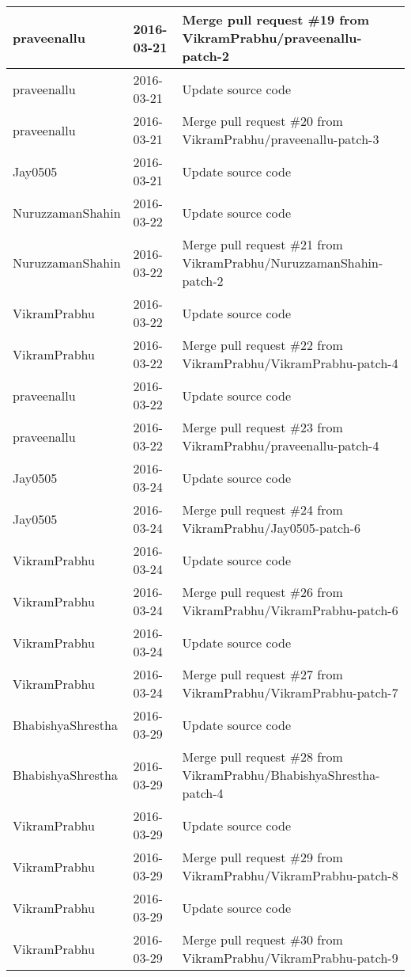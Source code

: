 \documentclass[a4paper]{article}
\begin{document}
\begin{center}
\begin{longtable}{|l|l|l|}
praveenallu & 2016-03-21 & Merge pull request \#19 from VikramPrabhu/praveenallu-patch-2 \\ \hline
praveenallu & 2016-03-21 & Update source code \\ \hline
praveenallu & 2016-03-21 & Merge pull request \#20 from VikramPrabhu/praveenallu-patch-3 \\ \hline
Jay0505 & 2016-03-21 & Update source code \\ \hline
NuruzzamanShahin & 2016-03-22 & Update source code \\ \hline
NuruzzamanShahin & 2016-03-22 & Merge pull request \#21 from VikramPrabhu/NuruzzamanShahin-patch-2 \\ \hline
VikramPrabhu & 2016-03-22 & Update source code \\ \hline
VikramPrabhu & 2016-03-22 & Merge pull request \#22 from VikramPrabhu/VikramPrabhu-patch-4 \\ \hline
praveenallu & 2016-03-22 & Update source code \\ \hline
praveenallu & 2016-03-22 & Merge pull request \#23 from VikramPrabhu/praveenallu-patch-4 \\ \hline
Jay0505 & 2016-03-24 & Update source code \\ \hline
Jay0505 & 2016-03-24 & Merge pull request \#24 from VikramPrabhu/Jay0505-patch-6 \\ \hline
VikramPrabhu & 2016-03-24 & Update source code \\ \hline
VikramPrabhu & 2016-03-24 & Merge pull request \#26 from VikramPrabhu/VikramPrabhu-patch-6 \\ \hline
VikramPrabhu & 2016-03-24 & Update source code \\ \hline
VikramPrabhu & 2016-03-24 & Merge pull request \#27 from VikramPrabhu/VikramPrabhu-patch-7 \\ \hline
BhabishyaShrestha & 2016-03-29 & Update source code \\ \hline
BhabishyaShrestha & 2016-03-29 & Merge pull request \#28 from VikramPrabhu/BhabishyaShrestha-patch-4 \\ \hline
VikramPrabhu & 2016-03-29 & Update source code \\ \hline
VikramPrabhu & 2016-03-29 & Merge pull request \#29 from VikramPrabhu/VikramPrabhu-patch-8 \\ \hline
VikramPrabhu & 2016-03-29 & Update source code \\ \hline
VikramPrabhu & 2016-03-29 & Merge pull request \#30 from VikramPrabhu/VikramPrabhu-patch-9 \\ \hline

\end{longtable}
\end{center}
\end{document}
